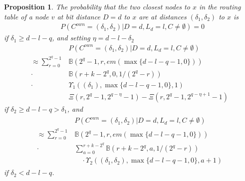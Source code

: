 \documentclass[10pt, conference, compsocconf, letterpaper]{IEEEtran}
\newcommand{\found}{\emptyset}
\renewcommand{\binom}{\mathbb{B}}
\renewcommand{\over}{\Xi}
\newcommand{\best}{\Upsilon}
\newtheorem{proposition}{Proposition}
\begin{document}
\begin{proposition}
\label{prop:s3}
The probability that the two closest nodes to $x$ in the routing table of a node $v$
at bit distance $D=d$ to $x$ are at distances $(\delta_1,\delta_2)$ to $x$ is
\begin{align}
\label{eq:beta1}
&P\left(C^{own}=(\delta_1, \delta_2)|D=d,L_d=l, C \neq \found\right) = 0
\end{align}
if $\delta_1 \geq d-l-q$, and setting $\eta=d-l-\delta_2$
\begin{align}
\label{eq:beta2}
&P\left(C^{own}=(\delta_1, \delta_2)|D=d,L_d=l,C \neq \found\right) \nonumber \\
 \approx \sum_{r=0}^{2^q-1}&\binom(2^q-1,r,em(\max\{d-l-q-1,0\})) \nonumber \\
\cdot &\binom(r+k-2^q,0,1/(2^q-r)) \\
\cdot &\best_1((\delta_1),\max\{d-l-q-1,0\},1) \nonumber \\
&\over(r,2^{q}-1,2^{q-\eta}-1)-\over(r,2^{q}-1,2^{q-\eta+1}-1) \nonumber 
\end{align}
if $\delta_2 \geq d-l-q > \delta_1$, and
\begin{align}
\label{eq:beta3}
\begin{split}
&P\left(C^{own}=(\delta_1, \delta_2)|D=d,L_d=l,C \neq \found\right) \\
\approx \sum_{r=0}^{2^q-1}&\binom(2^q-1,r,em(\max\{d-l-q-1,0\}))\\
\cdot &\sum_{a=0}^{r+k-2^q} \binom(r+k-2^q,a,1/(2^q-r))\\
&\quad \cdot \best_2((\delta_1,\delta_2),\max\{d-l-q-1,0\},a+1)
\end{split} 
\end{align}
if $\delta_2 < d-l-q$.
\end{proposition}
\end{document}
